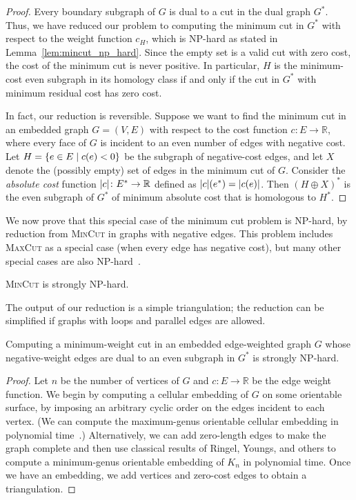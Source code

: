 \documentclass[letterpaper,review]{siamart190516}
\def\Real{\mathbb{R}}
\begin{document}
{\begin{proof}
Every boundary subgraph of $G$ is dual to a cut in the dual graph $G^*$.  Thus, we have reduced our problem to computing the minimum cut in $G^*$ with respect to the weight function $c_H$, which is NP-hard as stated in Lemma~\ref{lem:mincut_np_hard}.  Since the empty set is a valid cut with zero cost, the cost of the minimum cut is never positive.  In particular, $H$ is the minimum-cost even subgraph in its homology class if and only if the cut in $G^*$ with minimum residual cost has zero cost.

In fact, our reduction is reversible.  Suppose we want to find the minimum cut in an embedded graph $G = (V, E)$ with respect to the cost function $c\colon E\to \Real$, where every face of $G$ is incident to an even number of edges with negative cost.  Let $H = \{ {e\in E}\mid {c(e)<0} \}$ be the subgraph of negative-cost edges, and let $X$ denote the (possibly empty) set of edges in the minimum cut of $G$.  Consider the \emph{absolute cost} function $\abs{c}\colon E^*\to \Real$ defined as $\mathopen| c \mathclose|(e^*) = \mathopen| c(e) \mathclose|$.  Then $(H\oplus X)^*$ is the even subgraph of $G^*$ of minimum absolute cost that is homologous to $H^*$.
\end{proof}


We now prove that this special case of the minimum cut problem is {NP}-hard, by  reduction from \textsc{MinCut} in graphs with negative edges.  This problem includes \textsc{MaxCut} as a special case (when every edge has negative cost), but many other special cases are also {NP}-hard~\cite{mrr-edofm-03}.

\begin{lemma}
\label{lem:mincut_np_hard}
\textsc{MinCut} is strongly NP-hard.
\end{lemma}

The output of our reduction is a simple triangulation; the reduction can be simplified if graphs with loops and parallel edges are allowed.

\begin{lemma}
Computing a minimum-weight cut in an embedded edge-weighted graph $G$ whose negative-weight edges are dual to an even subgraph in $G^*$
is strongly NP-hard.
\end{lemma}
\begin{proof}
Let $n$ be the number of vertices of $G$ and $c\colon E\to \Real$ be the edge weight function.  We begin by computing a cellular embedding of $G$ on some orientable surface, by imposing an arbitrary cyclic order on the edges incident to each vertex.
(We can compute the maximum-genus orientable cellular embedding  in polynomial time~\cite{fgm-fmggi-88}.)  Alternatively, we can add zero-length edges to make the graph complete and then use classical results of Ringel, Youngs, and others \cite{ry-shmcp-68,r-mct-74} to compute a minimum-genus orientable embedding of $K_n$ in polynomial time.  Once we have an embedding, we add vertices and zero-cost edges to obtain a triangulation.


\end{proof}}
\end{document}

